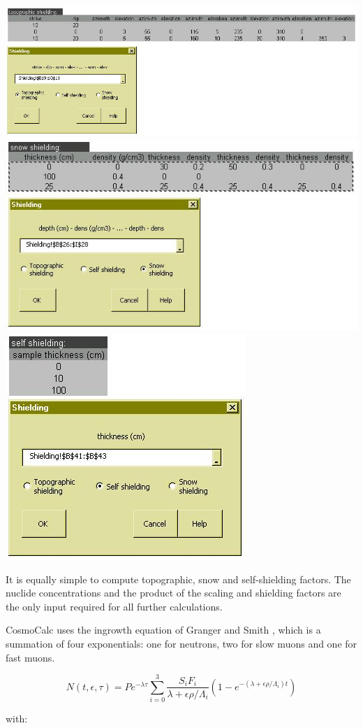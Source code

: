 \documentclass[12pt]{article}
\begin{document}
\begin{minipage}[tbp]{\textwidth}
\begin{center}
  \includegraphics[width=.71\textwidth]{shieldingTopo.jpg}\\
  \includegraphics[width=.6\textwidth]{shieldingSnow.jpg}
  \includegraphics[width=.35\textwidth]{shieldingSelf.jpg}\\
\end{center}
  It is equally simple to compute topographic, snow and self-shielding
  factors. The  nuclide concentrations and the product  of the scaling
  and shielding  factors are the  only input required for  all further
  calculations.
  \\
\end{minipage}

CosmoCalc   uses  the   ingrowth   equation  of   Granger  and   Smith
\cite{granger2000}, which is a summation of four exponentials: one for
neutrons, two for slow muons and one for fast muons.

$$N(t,\epsilon,\tau) = P e^{- \lambda \tau}
\sum_{i=0}^3
\frac{S_i F_i}{\lambda + \epsilon \rho / \Lambda_i} 
\left( 1 - e^{- \left( \lambda + \epsilon \rho / \Lambda_i \right) t} \right)
$$

with:\\
\end{document}

